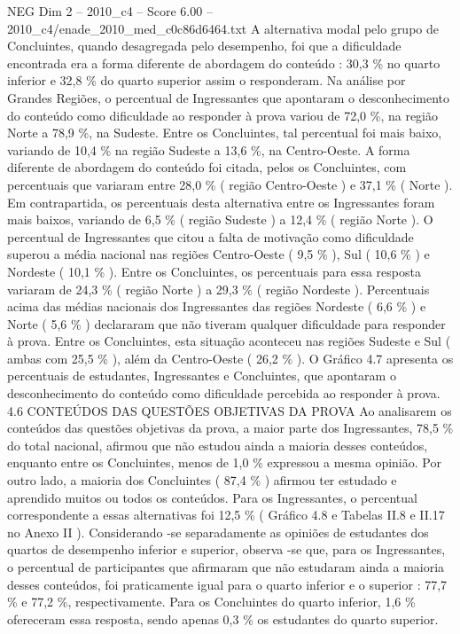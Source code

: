 \begin{textsample}{NEG Dim 2 – 2010\_c4 – Score 6.00 – 2010\_c4/enade\_2010\_med\_c0c86d6464.txt}
A alternativa modal pelo grupo de Concluintes, quando desagregada pelo desempenho, foi que a dificuldade encontrada era a forma diferente de abordagem do conteúdo : 30,3 \% no quarto inferior e 32,8 \% do quarto superior assim o responderam.
Na análise por Grandes Regiões, o percentual de Ingressantes que apontaram o desconhecimento do conteúdo como dificuldade ao responder à prova variou de 72,0 \%, na região Norte a 78,9 \%, na Sudeste.
Entre os Concluintes, tal percentual foi mais baixo, variando de 10,4 \% na região Sudeste a 13,6 \%, na Centro-Oeste.
A forma diferente de abordagem do conteúdo foi citada, pelos os Concluintes, com percentuais que variaram entre 28,0 \% ( região Centro-Oeste ) e 37,1 \% ( Norte ).
Em contrapartida, os percentuais desta alternativa entre os Ingressantes foram mais baixos, variando de 6,5 \% ( região Sudeste ) a 12,4 \% ( região Norte ).
O percentual de Ingressantes que citou a falta de motivação como dificuldade superou a média nacional nas regiões Centro-Oeste ( 9,5 \% ), Sul ( 10,6 \% ) e Nordeste ( 10,1 \% ).
Entre os Concluintes, os percentuais para essa resposta variaram de 24,3 \% ( região Norte ) a 29,3 \% ( região Nordeste ).
Percentuais acima das médias nacionais dos Ingressantes das regiões Nordeste ( 6,6 \% ) e Norte ( 5,6 \% ) declararam que não tiveram qualquer dificuldade para responder à prova.
Entre os Concluintes, esta situação aconteceu nas regiões Sudeste e Sul ( ambas com 25,5 \% ), além da Centro-Oeste ( 26,2 \% ).
O Gráfico 4.7 apresenta os percentuais de estudantes, Ingressantes e Concluintes, que apontaram o desconhecimento do conteúdo como dificuldade percebida ao responder à prova. 4.6 CONTEÚDOS DAS QUESTÕES OBJETIVAS DA PROVA Ao analisarem os conteúdos das questões objetivas da prova, a maior parte dos Ingressantes, 78,5 \% do total nacional, afirmou que não estudou ainda a maioria desses conteúdos, enquanto entre os Concluintes, menos de 1,0 \% expressou a mesma opinião.
Por outro lado, a maioria dos Concluintes ( 87,4 \% ) afirmou ter estudado e aprendido muitos ou todos os conteúdos.
Para os Ingressantes, o percentual correspondente a essas alternativas foi 12,5 \% ( Gráfico 4.8 e Tabelas II.8 e II.17 no Anexo II ).
Considerando -se separadamente as opiniões de estudantes dos quartos de desempenho inferior e superior, observa -se que, para os Ingressantes, o percentual de participantes que afirmaram que não estudaram ainda a maioria desses conteúdos, foi praticamente igual para o quarto inferior e o superior : 77,7 \% e 77,2 \%, respectivamente.
Para os Concluintes do quarto inferior, 1,6 \% ofereceram essa resposta, sendo apenas 0,3 \% os estudantes do quarto superior.

\end{textsample}
